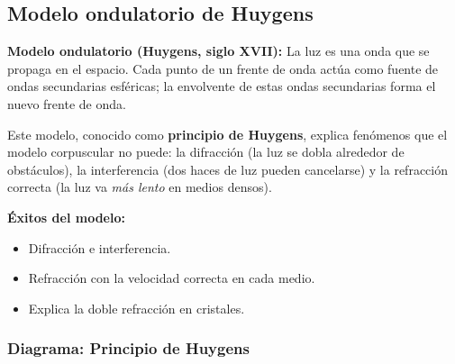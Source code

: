 \subsection{Modelo ondulatorio de Huygens}

\begin{seccion}
\begin{definicion}
\textbf{Modelo ondulatorio (Huygens, siglo XVII):} La luz es una onda que se propaga en el espacio. Cada punto de un frente de onda actúa como fuente de ondas secundarias esféricas; la envolvente de estas ondas secundarias forma el nuevo frente de onda.
\end{definicion}

Este modelo, conocido como \textbf{principio de Huygens}, explica fenómenos que el modelo corpuscular no puede: la difracción (la luz se dobla alrededor de obstáculos), la interferencia (dos haces de luz pueden cancelarse) y la refracción correcta (la luz va \textit{más lento} en medios densos).

\textbf{Éxitos del modelo:}
\begin{itemize}
    \item Difracción e interferencia.
    \item Refracción con la velocidad correcta en cada medio.
    \item Explica la doble refracción en cristales.
\end{itemize}
\end{seccion}

\subsubsection{Diagrama: Principio de Huygens}

\begin{center}
\end{center}


